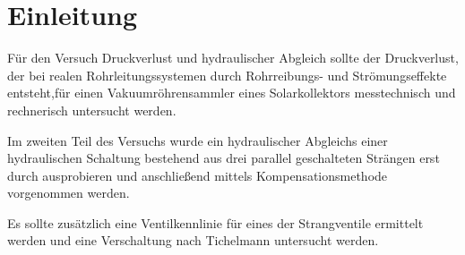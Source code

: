 \section{Einleitung}

Für den Versuch Druckverlust und hydraulischer Abgleich sollte der Druckverlust, der bei realen Rohrleitungssystemen durch Rohrreibungs- und Strömungseffekte entsteht,für einen Vakuumröhrensammler eines Solarkollektors messtechnisch und rechnerisch untersucht werden. 

Im zweiten Teil des Versuchs wurde ein hydraulischer Abgleichs einer hydraulischen Schaltung bestehend aus drei parallel geschalteten Strängen erst durch ausprobieren und anschließend mittels Kompensationsmethode vorgenommen werden. 

Es sollte zusätzlich eine Ventilkennlinie für eines der Strangventile ermittelt werden und eine Verschaltung nach Tichelmann untersucht werden. 